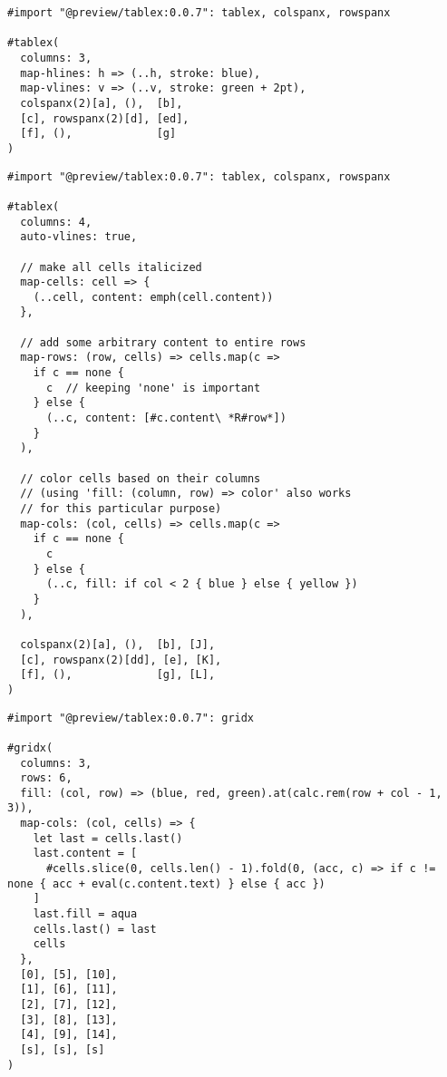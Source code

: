 \pandocbounded{}

\begin{verbatim}
#import "@preview/tablex:0.0.7": tablex, colspanx, rowspanx

#tablex(
  columns: 3,
  map-hlines: h => (..h, stroke: blue),
  map-vlines: v => (..v, stroke: green + 2pt),
  colspanx(2)[a], (),  [b],
  [c], rowspanx(2)[d], [ed],
  [f], (),             [g]
)
\end{verbatim}

\pandocbounded{}

\begin{verbatim}
#import "@preview/tablex:0.0.7": tablex, colspanx, rowspanx

#tablex(
  columns: 4,
  auto-vlines: true,

  // make all cells italicized
  map-cells: cell => {
    (..cell, content: emph(cell.content))
  },

  // add some arbitrary content to entire rows
  map-rows: (row, cells) => cells.map(c =>
    if c == none {
      c  // keeping 'none' is important
    } else {
      (..c, content: [#c.content\ *R#row*])
    }
  ),

  // color cells based on their columns
  // (using 'fill: (column, row) => color' also works
  // for this particular purpose)
  map-cols: (col, cells) => cells.map(c =>
    if c == none {
      c
    } else {
      (..c, fill: if col < 2 { blue } else { yellow })
    }
  ),

  colspanx(2)[a], (),  [b], [J],
  [c], rowspanx(2)[dd], [e], [K],
  [f], (),             [g], [L],
)
\end{verbatim}

\pandocbounded{}

\begin{verbatim}
#import "@preview/tablex:0.0.7": gridx

#gridx(
  columns: 3,
  rows: 6,
  fill: (col, row) => (blue, red, green).at(calc.rem(row + col - 1, 3)),
  map-cols: (col, cells) => {
    let last = cells.last()
    last.content = [
      #cells.slice(0, cells.len() - 1).fold(0, (acc, c) => if c != none { acc + eval(c.content.text) } else { acc })
    ]
    last.fill = aqua
    cells.last() = last
    cells
  },
  [0], [5], [10],
  [1], [6], [11],
  [2], [7], [12],
  [3], [8], [13],
  [4], [9], [14],
  [s], [s], [s]
)
\end{verbatim}

